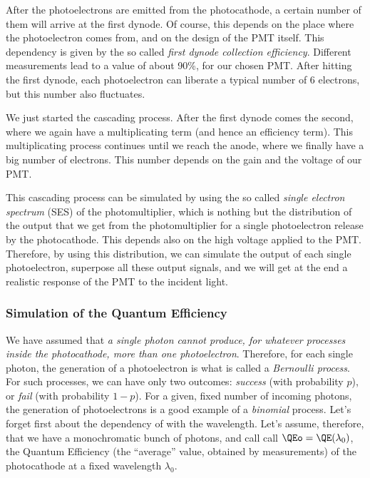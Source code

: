 After the photoelectrons are emitted from the photocathode, a certain
number of them will arrive at the first dynode. Of course, this
depends on the place where the photoelectron comes from, and on the
design of the PMT itself. This dependency is given by the so called
\emph{first dynode collection efficiency}. Different measurements lead
to a value of about 90\%, for our chosen PMT. After hitting the first
dynode, each photoelectron can liberate a typical number of 6
electrons, but this number also fluctuates.

We just started the cascading process. After the first dynode comes
the second, where we again have a multiplicating term (and hence an
efficiency term). This multiplicating process continues until we reach
the anode, where we finally have a big number of electrons. This
number depends on the gain and the voltage of our PMT.

This cascading process can be simulated by using the so called
\emph{single electron spectrum} (SES) of the photomultiplier, which is
nothing but the distribution of the output that we get from the
photomultiplier for a single photoelectron release by the
photocathode. This depends also on the high voltage applied to the
PMT. Therefore, by using this distribution, we can simulate the output
of each single photoelectron, superpose all these output signals, and
we will get at the end a realistic response of the PMT to the incident
light.

\subsubsection{Simulation of the Quantum Efficiency}

We have assumed that \emph{a single photon cannot produce, for
  whatever processes inside the photocathode, more than one
  photoelectron}. Therefore, for each single photon, the generation of
a photoelectron is what is called a \emph{Bernoulli process}. For such
processes, we can have only two outcomes: \emph{success} (with
probability $p$), or \emph{fail} (with probability $1-p$). For a
given, fixed number of incoming photons, the generation of
photoelectrons is a good example of a \emph{binomial} process. Let's
forget first about the dependency of \QE with the wavelength.  Let's
assume, therefore, that we have a monochromatic bunch of photons, and
call call $\QEo=\QE(\lambda_0)$, the Quantum Efficiency (the
``average'' value, obtained by measurements) of the photocathode at a
fixed wavelength $\lambda_0$.

